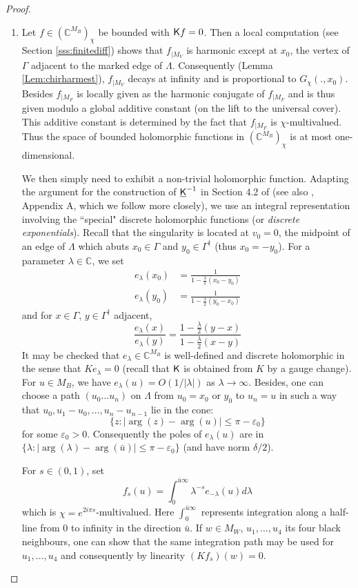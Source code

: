 \documentclass[10pt]{article}
\newcommand{\C}{\mathbb{C}}
\newcommand{\eps}{\varepsilon}
\newcommand{\rK}{{\sf K}}
\newcommand{\uK}{{\underline {\sf K}}}
\newcommand{\dg}{\dagger}
\begin{document}
\begin{proof}
\begin{enumerate}
\item
Let $f\in(\C^{M_B})_\chi$ be bounded with $\rK f=0$. Then a local computation (see Section \ref{sss:finitediff}) shows that $f_{|M_V}$ is harmonic except at $x_0$, the vertex of $\Gamma$ adjacent to the marked edge of $\Lambda$. Consequently (Lemma \ref{Lem:chirharmest}), $f_{|M_V}$ decays at infinity and is proportional to $G_\chi(.,x_0)$. Besides $f_{|M_F}$ is locally given as the harmonic conjugate of $f_{|M_F}$ and is thus given modulo a global additive constant (on the lift to the universal cover). This additive constant is determined by the fact that $f_{|M_F}$ is $\chi$-multivalued. Thus the space of bounded holomorphic functions in $(\C^{M_B})_\chi$ is at most one-dimensional.

We then simply need to exhibit a non-trivial holomorphic function. Adapting the argument for the construction of $\uK^{-1}$ in Section 4.2 of \cite{Ken_isoradial} (see also \cite{SmiChe_isoradial}, Appendix A, which we follow more closely), we use an integral representation involving the ``special" discrete holomorphic functions (or {\em discrete exponentials}). Recall that the singularity is located at $v_0=0$, the midpoint of an edge of $\Lambda$ which abuts $x_0\in\Gamma$ and $y_0\in\Gamma^\dg$ (thus $x_0=-y_0$). For a parameter $\lambda\in\C$, we set
\begin{align*}
e_\lambda(x_0)&=\frac 1{1-\frac \lambda 2(x_0-y_0)}\\
e_\lambda(y_0)&=\frac 1{1-\frac \lambda 2(y_0-x_0)}
\end{align*}
 and for $x\in\Gamma$, $y\in\Gamma^\dg$ adjacent, 
 $$\frac{e_\lambda(x)}{e_\lambda(y)}=\frac {1-\frac \lambda 2(y-x)}
{1-\frac \lambda 2(x-y)}$$
It may be checked that $e_\lambda\in\C^{M_B}$ is well-defined and discrete holomorphic in the sense that $K e_\lambda=0$ (recall that $\rK$ is obtained from $K$ by a gauge change). For $u\in M_B$, we have $e_\lambda(u)=O(1/|\lambda|)$ as $\lambda\rightarrow\infty$. Besides, one can choose a path $(u_0\dots u_n)$ on $\Lambda$ from $u_0=x_0$ or $y_0$ to $u_n=u$ in such a way that $u_0,u_1-u_0,\dots,u_{n}-u_{n-1}$ lie in the cone:
$$\{z:|\arg(z)-\arg(u)|\leq \pi-\eps_0\}$$
for some $\eps_0>0$. Consequently the poles of $e_\lambda(u)$ are in $\{\lambda:|\arg(\lambda)-\arg(\bar u)|\leq\pi-\eps_0\}$ (and have norm $\delta/2$).

For $s\in(0,1)$, set
$$f_s(u)=\int_0^{\bar u\infty}\lambda^{-s} e_{-\lambda}(u)d\lambda$$
which is $\chi=e^{2i\pi s}$-multivalued. Here $\int_0^{\bar u\infty}$ represents integration along a half-line from 0 to infinity in the direction $\bar u$. If $w\in M_W$, $u_1,\dots,u_4$ its four black neighbours, one can show that the same integration path may be used for $u_1,\dots,u_4$ and consequently by linearity $(K f_s)(w)=0$. 


\end{enumerate}
\end{proof}
\end{document}
